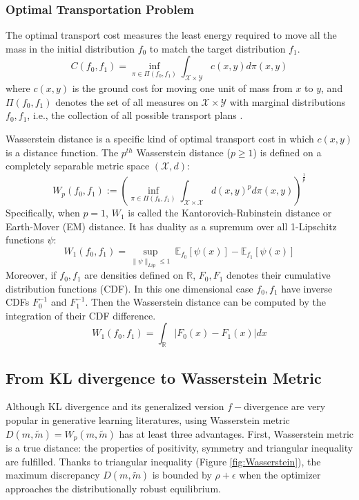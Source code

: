 \documentclass{article}
\begin{document}
\subsubsection{Optimal Transportation Problem}
The optimal transport cost measures the least energy required to move all the mass in the initial distribution $f_0$ to match the target distribution $f_1$.
\begin{equation}
C(f_0, f_1) = \inf_{\pi \in \Pi(f_0, f_1)} \int_{\mathcal{X}\times\mathcal{Y}} c(x,y) d\pi(x,y)
\end{equation}
where $c(x,y)$ is the ground cost for moving one unit of mass from $x$ to $y$, and $\Pi(f_0, f_1)$ denotes the set of all measures on $\mathcal{X}\times\mathcal{Y}$ with marginal distributions $f_0, f_1$, i.e., the collection of all possible transport plans \cite{Villani}.

Wasserstein distance is a specific kind of optimal transport cost in which $c(x,y)$ is a distance function. The $p^{th}$ Wasserstein distance ($p \geq 1$) is defined on a completely separable metric space $(\mathcal{X},d)$:
\begin{equation}
W_p(f_0, f_1) := (\inf_{\pi \in \Pi(f_0, f_1)} \int_{\mathcal{X}\times\mathcal{X}} d(x,y)^p d\pi(x,y))^\frac{1}{p}
\end{equation}
Specifically, when $p=1$, $W_1$ is called the Kantorovich-Rubinstein distance or Earth-Mover (EM) distance. It has duality as a supremum over all 1-Lipschitz functions $\psi$:
\begin{equation}
\label{eq:Kantorovich}
W_1(f_0, f_1) = \sup_{\|\psi\|_{Lip} \leq 1} \ \mathbb{E}_{f_0}[\psi(x)] -  \mathbb{E}_{f_1}[\psi(x)]
\end{equation}
Moreover, if $f_0, f_1$ are densities defined on $\mathbb{R}$, $F_0, F_1$ denotes their cumulative distribution functions (CDF). In this one dimensional case $f_0, f_1$ have inverse CDFs $F_0^{-1}$ and $F_1^{-1}$. Then the Wasserstein distance can be computed by the integration of their CDF difference.
\begin{equation}
W_1(f_0, f_1) = \int_\mathbb{R} |F_0(x) - F_1(x)| dx
\end{equation}


\subsection{From KL divergence to Wasserstein Metric}
Although KL divergence and its generalized version $f-$divergence are very popular in generative learning literatures, using Wasserstein metric $D(m,\tilde{m}) = W_p(m,\tilde{m})$ has at least three advantages. First, Wasserstein metric is a true distance: the properties of positivity, symmetry and triangular inequality are fulfilled. Thanks to triangular inequality (Figure \ref{fig:Wasserstein}), the maximum discrepancy $D(m,\tilde{m})$ is bounded by $\rho + \epsilon$ when the optimizer approaches the distributionally robust equilibrium.
\end{document}
